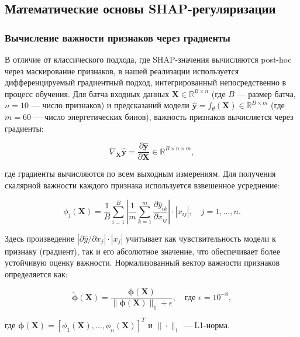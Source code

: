 \subsection{Математические основы SHAP-регуляризации}

\subsubsection{Вычисление важности признаков через градиенты}

В отличие от классического подхода, где SHAP-значения вычисляются post-hoc через маскирование признаков, в нашей реализации используется дифференцируемый градиентный подход, интегрированный непосредственно в процесс обучения. Для батча входных данных $\mathbf{X} \in \mathbb{R}^{B \times n}$ (где $B$ --- размер батча, $n=10$ --- число признаков) и предсказаний модели $\hat{\mathbf{y}} = f_{\theta}(\mathbf{X}) \in \mathbb{R}^{B \times m}$ (где $m=60$ --- число энергетических бинов), важность признаков вычисляется через градиенты:

\begin{equation}
\nabla_{\mathbf{X}} \hat{\mathbf{y}} = \frac{\partial \hat{\mathbf{y}}}{\partial \mathbf{X}} \in \mathbb{R}^{B \times n \times m},
\end{equation}

где градиенты вычисляются по всем выходным измерениям. Для получения скалярной важности каждого признака используется взвешенное усреднение:

\begin{equation}
\phi_j(\mathbf{X}) = \frac{1}{B} \sum_{i=1}^{B} \left| \frac{1}{m} \sum_{k=1}^{m} \frac{\partial \hat{y}_{ik}}{\partial x_{ij}} \right| \cdot |x_{ij}|, \quad j = 1, \ldots, n.
\end{equation}

Здесь произведение $|\partial \hat{y}/\partial x_j| \cdot |x_j|$ учитывает как чувствительность модели к признаку (градиент), так и его абсолютное значение, что обеспечивает более устойчивую оценку важности. Нормализованный вектор важности признаков определяется как:

\begin{equation}
\tilde{\boldsymbol{\phi}}(\mathbf{X}) = \frac{\boldsymbol{\phi}(\mathbf{X})}{\|\boldsymbol{\phi}(\mathbf{X})\|_1 + \epsilon}, \quad \text{где } \epsilon = 10^{-8},
\end{equation}

где $\boldsymbol{\phi}(\mathbf{X}) = [\phi_1(\mathbf{X}), \ldots, \phi_n(\mathbf{X})]^T$ и $\|\cdot\|_1$ --- L1-норма.

